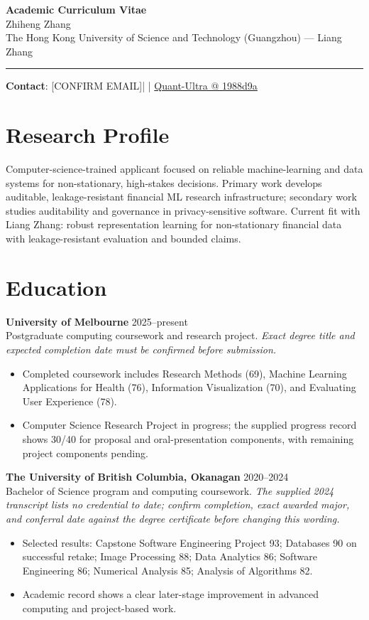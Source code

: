 \documentclass[11pt]{article}
\makeatletter
\newcommand{\ApplicantName}{Zhiheng Zhang}
\newcommand{\ApplicantEmail}{[CONFIRM EMAIL]}
\newcommand{\ApplicantPhone}{[CONFIRM PHONE]}
\newcommand{\ApplicantGitHub}{\href{https://github.com/zhiheng-zhang-Mera/Quant-Ultra/tree/1988d9a8530da91a8158de864d098ea869098923}{Quant-Ultra @ 1988d9a}}
\makeatother
\begin{document}
\begin{center}
{\LARGE\bfseries Academic Curriculum Vitae}\\[0.25em]
{\large \ApplicantName}\\
The Hong Kong University of Science and Technology (Guangzhou) --- Liang Zhang
\end{center}
\vspace{0.35em}\hrule\vspace{0.65em}

\textbf{Contact}: \ApplicantEmail\quad | \quad \ApplicantPhone\quad | \quad \ApplicantGitHub

\section*{Research Profile}
Computer-science-trained applicant focused on reliable machine-learning and data systems for non-stationary, high-stakes decisions. Primary work develops auditable, leakage-resistant financial ML research infrastructure; secondary work studies auditability and governance in privacy-sensitive software. Current fit with Liang Zhang: robust representation learning for non-stationary financial data with leakage-resistant evaluation and bounded claims.

\section*{Education}
\textbf{University of Melbourne} \hfill 2025--present\\
Postgraduate computing coursework and research project. \textit{Exact degree title and expected completion date must be confirmed before submission.}
\begin{itemize}
\item Completed coursework includes Research Methods (69), Machine Learning Applications for Health (76), Information Visualization (70), and Evaluating User Experience (78).
\item Computer Science Research Project in progress; the supplied progress record shows 30/40 for proposal and oral-presentation components, with remaining project components pending.
\end{itemize}

\textbf{The University of British Columbia, Okanagan} \hfill 2020--2024\\
Bachelor of Science program and computing coursework. \textit{The supplied 2024 transcript lists no credential to date; confirm completion, exact awarded major, and conferral date against the degree certificate before changing this wording.}
\begin{itemize}
\item Selected results: Capstone Software Engineering Project 93; Databases 90 on successful retake; Image Processing 88; Data Analytics 86; Software Engineering 86; Numerical Analysis 85; Analysis of Algorithms 82.
\item Academic record shows a clear later-stage improvement in advanced computing and project-based work.
\end{itemize}
\end{document}

